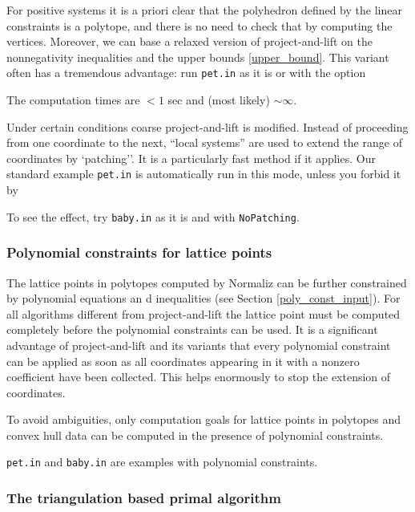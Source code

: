 For positive systems it is a priori clear that the polyhedron defined by the linear constraints is a polytope, and there is no need to check that by computing the vertices. Moreover, we can base a relaxed version of project-and-lift on the nonnegativity inequalities and the upper bounds \ref{upper_bound}.  This variant often has a tremendous advantage: run \verb|pet.in| as it is or with the option
\begin{itemize}
	\itemtt[NoCoarseProjection]
\end{itemize}
The computation times are $< 1$ sec and (most likely) $\sim\infty$.

Under certain conditions coarse project-and-lift is modified. Instead of proceeding from one coordinate to the next, ``local systems'' are used to extend the range of coordinates by `patching''. It is a particularly fast method if it applies. Our standard example \verb|pet.in| is automatically run in this mode, unless you forbid it by
\begin{itemize}
	\itemtt[NoPatching]
\end{itemize}
To see the effect, try \verb|baby.in| as it is and with \verb|NoPatching|.

\subsubsection{Polynomial constraints for lattice points}\label{poly_const}

The lattice points in polytopes computed by Normaliz can be further constrained by polynomial equations an d inequalities (see Section \ref{poly_const_input}). For all algorithms different from project-and-lift the lattice point must be computed completely before the polynomial constraints can be used. It is a significant advantage of project-and-lift and its variants that every polynomial constraint can be applied as soon as all coordinates appearing  in it with a nonzero coefficient have been collected. This helps enormously to stop the extension of coordinates. 

To avoid ambiguities, only computation goals for lattice points in polytopes and convex hull data can be computed in the presence of polynomial constraints. 

\verb|pet.in| and \verb|baby.in| are examples with polynomial constraints.

\subsubsection{The triangulation based primal algorithm}

